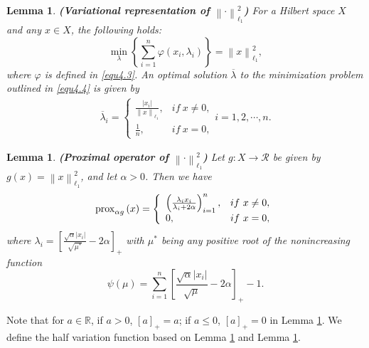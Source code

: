 \documentclass[a4paper,12pt]{article}
\newtheorem{lemma}[theorem]{Lemma}
\numberwithin{equation}{section}
\begin{document}
\begin{lemma}\label{lem4.2}
    \textbf{(Variational representation of $\left\|\cdot\right\|_{\ell_{1}}^{2}$)} For a Hilbert space $X$ and any $x\in X$, the following holds:
    \begin{equation}\label{equ4.4}
        \min_{\lambda}\left\{\sum_{i=1}^{n}\varphi\left(x_{i},\lambda_{i} \right)\right\}=\left\|x\right\|_{\ell_{1}}^{2},
    \end{equation}
    where $\varphi$ is defined in \eqref{equ4.3}. An optimal solution $\overline{\lambda}$ to the minimization problem outlined in \eqref{equ4.4} is given by
    \begin{align*}
        \overline{\lambda}_{i}=
        \left\{             
             \begin{array}{ll}
             \frac{\left|x_{i}\right|}{\left\|x\right\|_{\ell_{1}}}, & if \ x\neq 0, \\
             \frac{1}{n}, & if \ x=0,
             \end{array}
        \right.
        i=1,2,\cdots,n. 
    \end{align*}
\end{lemma}

\begin{lemma}\label{lem4.3}
    \textbf{(Proximal operator of $\left\|\cdot\right\|_{\ell_{1}}^{2}$)} Let $g:X\rightarrow \mathcal{R}$ be given by $g\left(x\right)=\left\|x\right\|_{\ell_{1}}^{2}$, and let $\alpha>0$. Then we have 
    \begin{equation*}
        {\rm prox}_{\alpha g}\left(x\right)=
        \left\{             
             \begin{array}{ll}
             \left(\frac{\lambda_{i}x_{i}}{\lambda_{i}+2\alpha}\right)_{i=1}^{n}, & if \ x\neq 0, \\
             0, & if \ x=0,
             \end{array}
        \right.
    \end{equation*}
    where $\lambda_{i}=\left[\frac{\sqrt{\alpha}\left|x_{i}\right|}{\sqrt{\mu^{*}}}-2\alpha\right]_{+}$ with $\mu^{*}$ being any positive root of the nonincreasing function 
    \begin{equation*}
        \psi\left(\mu\right)=\sum_{i=1}^{n}\left[\frac{\sqrt{\alpha}\left|x_{i}\right|} {\sqrt{\mu}}-2\alpha\right]_{+}-1.
    \end{equation*}
\end{lemma}

\par Note that for $a\in\mathbb{R}$, if $a>0$, $\left[a\right]_{+}=a$; if $a\leq 0$, $\left[a\right]_{+}=0$ in Lemma \ref{lem4.3}. We define the half variation function based on Lemma \ref{lem4.2} and Lemma \ref{lem4.3}.
\end{document}
